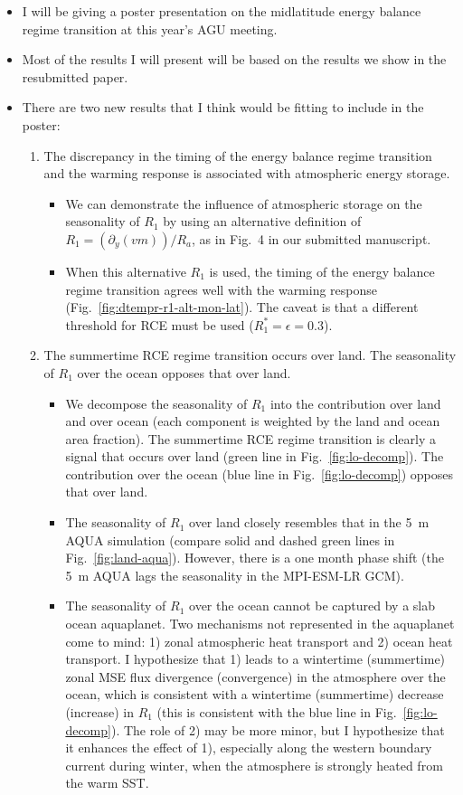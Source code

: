 \documentclass{article}
\begin{document}
\begin{itemize}
    \item I will be giving a poster presentation on the midlatitude energy balance regime transition at this year's AGU meeting.
    \item Most of the results I will present will be based on the results we show in the resubmitted paper.
    \item There are two new results that I think would be fitting to include in the poster:
        \begin{enumerate}
            \item The discrepancy in the timing of the energy balance regime transition and the warming response is associated with atmospheric energy storage.
                \begin{itemize}
                    \item We can demonstrate the influence of atmospheric storage on the seasonality of $R_1$ by using an alternative definition of $R_1=(\partial_y(vm))/R_a$, as in Fig.~4 in our submitted manuscript.
                    \item When this alternative $R_1$ is used, the timing of the energy balance regime transition agrees well with the warming response (Fig.~\ref{fig:dtempr-r1-alt-mon-lat}). The caveat is that a different threshold for RCE must be used ($R_1^*=\epsilon=0.3$).
                \end{itemize}
            \item The summertime RCE regime transition occurs over land. The seasonality of $R_1$ over the ocean opposes that over land.
                \begin{itemize}
                    \item We decompose the seasonality of $R_1$ into the contribution over land and over ocean (each component is weighted by the land and ocean area fraction). The summertime RCE regime transition is clearly a signal that occurs over land (green line in Fig.~\ref{fig:lo-decomp}). The contribution over the ocean (blue line in Fig.~\ref{fig:lo-decomp}) opposes that over land.
                    \item The seasonality of $R_1$ over land closely resembles that in the 5~m AQUA simulation (compare solid and dashed green lines in Fig.~\ref{fig:land-aqua}). However, there is a one month phase shift (the 5~m AQUA lags the seasonality in the MPI-ESM-LR GCM).
                    \item The seasonality of $R_1$ over the ocean cannot be captured by a slab ocean aquaplanet. Two mechanisms not represented in the aquaplanet come to mind: 1) zonal atmospheric heat transport and 2) ocean heat transport. I hypothesize that 1) leads to a wintertime (summertime) zonal MSE flux divergence (convergence) in the atmosphere over the ocean, which is consistent with a wintertime (summertime) decrease (increase) in $R_1$ (this is consistent with the blue line in Fig.~\ref{fig:lo-decomp}). The role of 2) may be more minor, but I hypothesize that it enhances the effect of 1), especially along the western boundary current during winter, when the atmosphere is strongly heated from the warm SST.

\end{itemize}
\end{enumerate}
\end{itemize}
\end{document}
